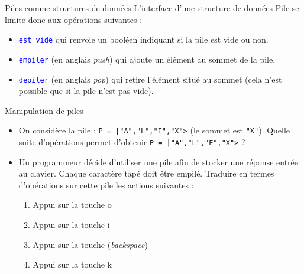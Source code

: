 \documentclass[10pt]{beamer}
\begin{document}
\begin{frame}{\Ctitle}{\stitle}
	\begin{alertblock}{Piles comme structures de données}
		L'interface d'une structure de données Pile se limite donc aux opérations suivantes :
		\begin{itemize}
			\item<2-> \textcolor{blue}{\tt est\_vide} qui renvoie un booléen indiquant si la pile est vide ou non.
			\item<3-> \textcolor{blue}{\tt empiler} (en anglais \textit{push}) qui ajoute un élément au sommet de la pile.
			\item<4-> \textcolor{blue}{\tt depiler} (en anglais \textit{pop}) qui retire l'élément situé au sommet (cela n'est possible que si la pile n'est pas vide).
		\end{itemize}
	\end{alertblock}
\end{frame}

\begin{frame}{\Ctitle}{\stitle}
	\begin{exampleblock}{Manipulation de piles}
		\begin{itemize}
			\item<2-> On considère la pile : {\tt P = |"A","L","I","X">} (le sommet est {\tt "X"}). Quelle suite d'opérations permet d'obtenir {\tt P = |"A","L","E","X">} ?
			\item<3-> Un programmeur décide d'utiliser une pile afin de stocker une réponse entrée au clavier. Chaque caractère tapé doit être empilé. Traduire en termes d'opérations sur cette pile les actions suivantes :
				\begin{enumerate}
					\item<4-> Appui sur la touche \og{}o\fg{}
					\item<5-> Appui sur la touche \og{}i\fg{}
					\item<6-> Appui sur la touche \framebox{$\longleftarrow$} (\textit{backspace})
					\item<7-> Appui sur la touche \og{}k\fg{}
				\end{enumerate}
		\end{itemize}
	\end{exampleblock}
\end{frame}
\end{document}
